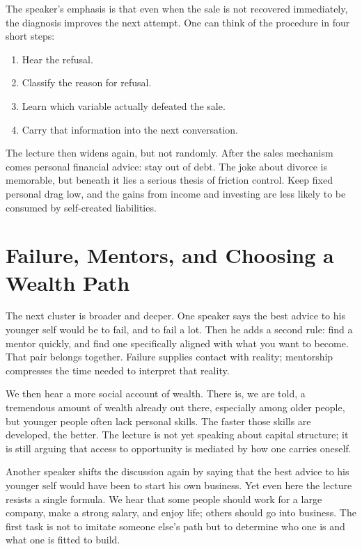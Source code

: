 The speaker's emphasis is that even when the sale is not recovered immediately, the diagnosis improves the next attempt. One can think of the procedure in four short steps:
\begin{enumerate}
\item Hear the refusal.
\item Classify the reason for refusal.
\item Learn which variable actually defeated the sale.
\item Carry that information into the next conversation.
\end{enumerate}

The lecture then widens again, but not randomly. After the sales mechanism comes personal financial advice: stay out of debt. The joke about divorce is memorable, but beneath it lies a serious thesis of friction control. Keep fixed personal drag low, and the gains from income and investing are less likely to be consumed by self-created liabilities.

\section{Failure, Mentors, and Choosing a Wealth Path}

The next cluster is broader and deeper. One speaker says the best advice to his younger self would be to fail, and to fail a lot. Then he adds a second rule: find a mentor quickly, and find one specifically aligned with what you want to become. That pair belongs together. Failure supplies contact with reality; mentorship compresses the time needed to interpret that reality.

We then hear a more social account of wealth. There is, we are told, a tremendous amount of wealth already out there, especially among older people, but younger people often lack personal skills. The faster those skills are developed, the better. The lecture is not yet speaking about capital structure; it is still arguing that access to opportunity is mediated by how one carries oneself.

Another speaker shifts the discussion again by saying that the best advice to his younger self would have been to start his own business. Yet even here the lecture resists a single formula. We hear that some people should work for a large company, make a strong salary, and enjoy life; others should go into business. The first task is not to imitate someone else's path but to determine who one is and what one is fitted to build.

